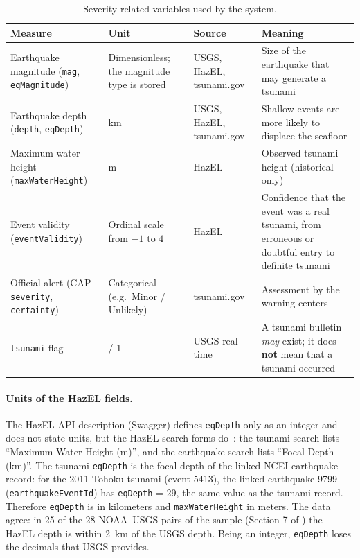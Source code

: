 \documentclass[a4paper,11pt,oneside]{book}
\begin{document}
\begin{table}[H]
\centering
\small
\noindent\begin{tabularx}{\textwidth}{@{}>{\raggedright\arraybackslash}p{3.5cm}>{\raggedright\arraybackslash}p{3.2cm}>{\raggedright\arraybackslash}p{2.6cm}>{\raggedright\arraybackslash}X@{}}
\toprule
Measure & Unit & Source & Meaning \\
\midrule
Earthquake magnitude (\texttt{mag}, \texttt{eqMagnitude}) & Dimensionless; the magnitude type is stored & USGS, HazEL, tsunami.gov & Size of the earthquake that may generate a tsunami \\
Earthquake depth (\texttt{depth}, \texttt{eqDepth}) & km & USGS, HazEL, tsunami.gov & Shallow events are more likely to displace the seafloor \\
Maximum water height (\texttt{maxWaterHeight}) & m & HazEL & Observed tsunami height (historical only) \\
Event validity (\texttt{eventValidity}) & Ordinal scale from $-1$ to $4$ & HazEL & Confidence that the event was a real tsunami, from erroneous or doubtful entry to definite tsunami \\
Official alert (CAP \texttt{severity}, \texttt{certainty}) & Categorical (e.g.\ Minor / Unlikely) & tsunami.gov & Assessment by the warning centers \\
\texttt{tsunami} flag & 0 / 1 & USGS real-time & A tsunami bulletin \emph{may} exist; it does \textbf{not} mean that a tsunami occurred \\
\bottomrule
\end{tabularx}
\caption{Severity-related variables used by the system.}
\label{tab:severity}
\end{table}

\paragraph{Units of the HazEL fields.}
The HazEL API description (Swagger) defines \texttt{eqDepth} only as an integer and does not state units, but the HazEL search forms do~\cite{hazelforms}: the tsunami search lists ``Maximum Water Height (m)'', and the earthquake search lists ``Focal Depth (km)''.
The tsunami \texttt{eqDepth} is the focal depth of the linked NCEI earthquake record: for the 2011 Tohoku tsunami (event 5413), the linked earthquake 9799 (\texttt{earthquakeEventId}) has \texttt{eqDepth} = 29, the same value as the tsunami record.
Therefore \texttt{eqDepth} is in kilometers and \texttt{maxWaterHeight} in meters.
The data agree: in 25 of the 28 NOAA--USGS pairs of the sample (Section 7 of ) the HazEL depth is within 2~km of the USGS depth.
Being an integer, \texttt{eqDepth} loses the decimals that USGS provides.
\end{document}
